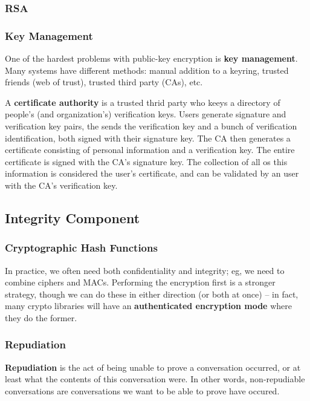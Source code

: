 \documentclass[12pt]{article}
\begin{document}
\subsubsection*{RSA}

\subsubsection*{Key Management}
One of the hardest problems with public-key encryption is {\bf key management}. Many systems have different methods: manual addition to a keyring, trusted friends (web of trust), trusted third party (CAs), etc.

A {\bf certificate authority} is a trusted thrid party who keeys a directory of people's (and organization's) verification keys. Users generate signature and verification key pairs, the sends the verification key and a bunch of verification identification, both signed with their signature key. The CA then generates a certificate consisting of personal information and a verification key. The entire certificate is signed with the CA's signature key. The collection of all os this information is considered the user's certificate, and can be validated by an user with the CA's verification key.

\subsection*{Integrity Component}

\subsubsection*{Cryptographic Hash Functions}

In practice, we often need both confidentiality and integrity; eg, we need to combine ciphers and MACs. Performing the encryption first is a stronger strategy, though we can do these in either direction (or both at once) -- in fact, many crypto libraries will have an {\bf authenticated encryption mode} where they do the former.

\subsubsection*{Repudiation}
{\bf Repudiation} is the act of being unable to prove a conversation occurred, or at least what the contents of this conversation were. In other words, non-repudiable conversations are conversations we want to be able to prove have occured.
\end{document}
